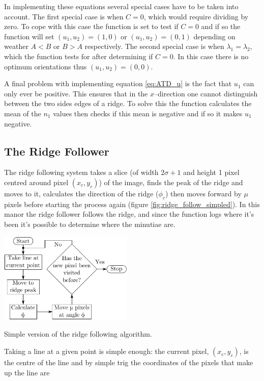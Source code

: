 \documentclass[11pt,a4paper]{article}
\makeatletter
\newenvironment{figurehere}
    {\def\@captype{figure}}
    {}
\makeatother
\begin{document}
\begin{multicols}{2}
		In implementing these equations several special cases have to be taken into account. The first special case is when $C = 0$, which would require dividing by zero. To cope with this case the function is set to test if $C = 0$ and if so the function will set $(u_1, u_2) = (1,0)$ or $(u_1, u_2) = (0,1)$ depending on weather $A < B$ or $B > A$ respectively. The second special case is  when $\lambda_1 = \lambda_2$, which the function tests for after determining if $C = 0$. In this case there is no optimum orientations thus $(u_1, u_2) = (0,0)$.

		A final problem with implementing equation \eqref{eq:ATD_u} is the fact that $u_1$ can only ever be positive. This ensures that in the $x$--direction one cannot distinguish between the two sides edges of a ridge. To solve this the function calculates the mean of the $n_1$ values then checks if this mean is negative and if so it makes $u_1$ negative.

	\subsection{The Ridge Follower}
		The ridge following system takes a slice (of width $2 \sigma + 1$ and height 1 pixel centred around pixel $(x_c, y_c)$) of the image, finds the peak of the ridge and moves to it, calculates the direction of the ridge ($\phi_c$) then moves forward by $\mu$ pixels before starting the process again (figure \ref{fig:ridge_follow_simpled}). In this manor the ridge follower follows the ridge, and since the function logs where it's been it's possible to determine where the minutiae are.

\begin{figurehere}
\centering
\includegraphics[width = 0.48\textwidth]{ridge_follow_simpled}
\caption{Simple version of the ridge following algorithm.}
\label{fig:ridge_follow_simpled}
\end{figurehere}

		Taking a line at a given point is simple enough: the current pixel, $(x_c, y_c)$, is the centre of the line and by simple trig the coordinates of the pixels that make up the line are


\end{multicols}
\end{document}
